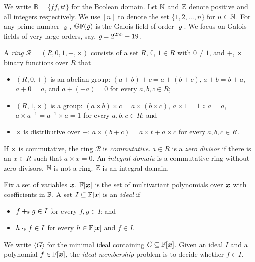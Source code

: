 
We write $\mathbb{B} = \{ \mathit{ff}, \mathit{tt} \}$ for the Boolean
domain. Let $\mathbb{N}$ and $\mathbb{Z}$ denote positive and all integers
respectively. We use $[n]$ to denote the set $\{ 1, 2, \ldots, n \}$
for $n \in \mathbb{N}$. For any prime number $\varrho$, $\mathbb{GF}(\varrho)$
is the Galois field of order $\varrho$. We focus on Galois fields of
very large orders, say, $\varrho = 2^{255} - 19$. 

A {\em ring} $\mathcal{R} = (R, 0, 1, +, \times)$ consists of a set
$R$, $0$, $1 \in R$ with $0 \neq 1$, and $+$, $\times$ binary
functions over $R$ that
\begin{itemize}
\item $(R, 0, +)$ is an abelian group: $(a + b) + c = a + (b
  + c)$, $a + b = b + a$, $a + 0 = a$, and $a + (-a) = 0$ for every
  $a, b, c \in R$; 
\item $(R, 1, \times)$ is a group: $(a \times b) \times c = a
  \times (b \times c)$, $a \times 1 = 1 \times a = a$, $a \times
  a^{-1} = a^{-1} \times a = 1$ for every $a, b, c \in R$; and 
\item $\times$ is distributive over $+$: $a \times (b + c) = a \times
  b + a \times c$ for every $a, b, c \in R$.
\end{itemize}
If $\times$ is commutative, the ring $\mathcal{R}$ is
\emph{commutative}. $a \in R$ is a \emph{zero divisor} if there is an
$x \in R$ such that $a \times x = 0$. An \emph{integral domain} is a
commutative ring without zero divisors. $\mathbb{N}$ is not a ring.
$\mathbb{Z}$ is an integral domain.

Fix a set of variables $\vx$. $\bbfF[\vx]$ is the set of multivariant
polynomials over $\vx$ with coefficients in $\mathbb{F}$. A set 
$I \subseteq \bbfF[\vx]$ is an \emph{ideal} if
\begin{itemize}
\item $f +_{\mathbb{F}} g \in I$ for every $f, g \in I$; and
\item $h \cdot_{\mathbb{F}} f \in I$ for every $h \in \bbfF[\vx]$ and $f \in I$.
\end{itemize}
We write $\langle G \rangle$ for the minimal ideal containing $G
\subseteq \bbfF[\vx]$. Given an ideal $I$ and a polynomial $f \in
\bbfF[\vx]$, the \emph{ideal membership} problem is to decide whether
$f \in I$.